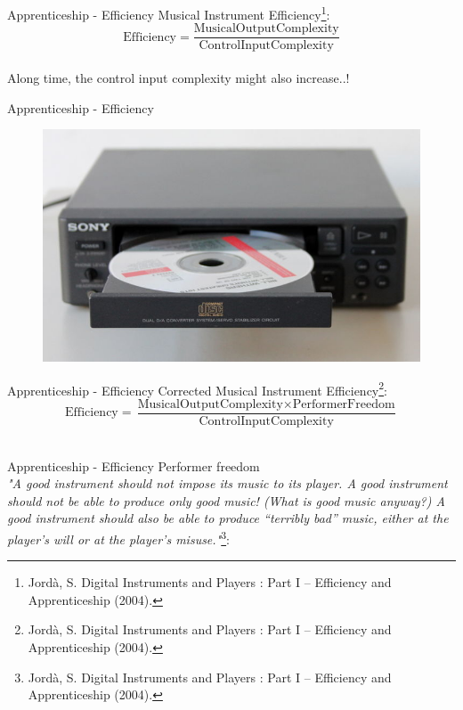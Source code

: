 \documentclass{beamer}
\begin{document}
\begin{frame}{Apprenticeship - Efficiency}
    Musical Instrument Efficiency\footnote{Jordà, S. Digital Instruments and Players : Part I – Efficiency and Apprenticeship (2004).}:
   \begin{equation*}
       \text{Efficiency} = \frac{\text{MusicalOutputComplexity}}{\text{ControlInputComplexity}}
   \end{equation*}\\
   \vspace{5mm}
   Along time, the control input complexity might also increase..!
\end{frame}

\begin{frame}{Apprenticeship - Efficiency}
    \begin{figure}[h]
        \includegraphics[width=\textwidth]{cd.jpg}
    \end{figure}
\end{frame}

\begin{frame}{Apprenticeship - Efficiency}
    Corrected Musical Instrument Efficiency\footnote{Jordà, S. Digital Instruments and Players : Part I – Efficiency and Apprenticeship (2004).}:\\
    \vspace{5mm}
    \begin{equation*}
       \text{Efficiency} = \frac{\text{MusicalOutputComplexity} \times \text{PerformerFreedom} }{\text{ControlInputComplexity}}
    \end{equation*}\\
\end{frame}

\begin{frame}{Apprenticeship - Efficiency}
    Performer freedom\\
    \vspace{5mm}
    \textit{"A good instrument should not impose its music to its player. A good instrument should not be able to produce only good music! (What is good music anyway?) A good instrument should also be able to produce “terribly bad” music, either at the player’s will or at the player’s misuse."}\footnote{Jordà, S. Digital Instruments and Players : Part I – Efficiency and Apprenticeship (2004).}:
\end{frame}
\end{document}
